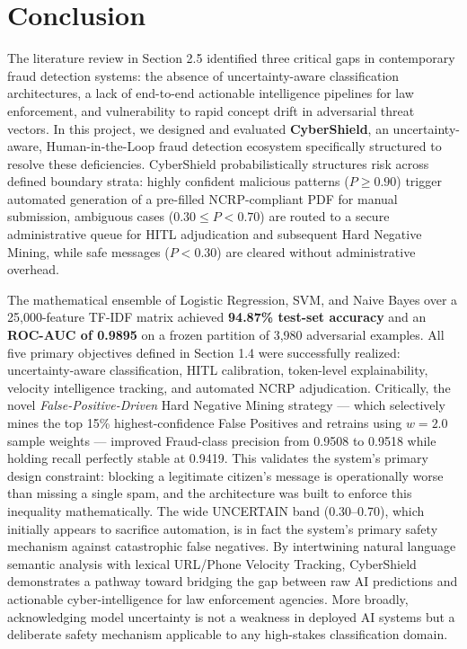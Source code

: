 \section{Conclusion}
The literature review in Section 2.5 identified three critical gaps in contemporary fraud detection systems: the absence of uncertainty-aware classification architectures, a lack of end-to-end actionable intelligence pipelines for law enforcement, and vulnerability to rapid concept drift in adversarial threat vectors. In this project, we designed and evaluated \textbf{CyberShield}, an uncertainty-aware, Human-in-the-Loop fraud detection ecosystem specifically structured to resolve these deficiencies. CyberShield probabilistically structures risk across defined boundary strata: highly confident malicious patterns ($P \geq 0.90$) trigger automated generation of a pre-filled NCRP-compliant PDF for manual submission, ambiguous cases ($0.30 \leq P < 0.70$) are routed to a secure administrative queue for HITL adjudication \cite{holzinger2016interactive} and subsequent Hard Negative Mining, while safe messages ($P < 0.30$) are cleared without administrative overhead.

The mathematical ensemble of Logistic Regression, SVM, and Naive Bayes over a 25,000-feature TF-IDF matrix achieved \textbf{94.87\% test-set accuracy} and an \textbf{ROC-AUC of 0.9895} on a frozen partition of 3,980 adversarial examples. All five primary objectives defined in Section 1.4 were successfully realized: uncertainty-aware classification, HITL calibration, token-level explainability, velocity intelligence tracking, and automated NCRP adjudication. Critically, the novel \textit{False-Positive-Driven} Hard Negative Mining strategy --- which selectively mines the top 15\% highest-confidence False Positives and retrains using $w=2.0$ sample weights --- improved Fraud-class precision from 0.9508 to 0.9518 while holding recall perfectly stable at 0.9419. This validates the system's primary design constraint: blocking a legitimate citizen's message is operationally worse than missing a single spam, and the architecture was built to enforce this inequality mathematically. The wide UNCERTAIN band (0.30--0.70), which initially appears to sacrifice automation, is in fact the system's primary safety mechanism against catastrophic false negatives. By intertwining natural language semantic analysis with lexical URL/Phone Velocity Tracking, CyberShield demonstrates a pathway toward bridging the gap between raw AI predictions and actionable cyber-intelligence for law enforcement agencies. More broadly, acknowledging model uncertainty is not a weakness in deployed AI systems but a deliberate safety mechanism applicable to any high-stakes classification domain.

